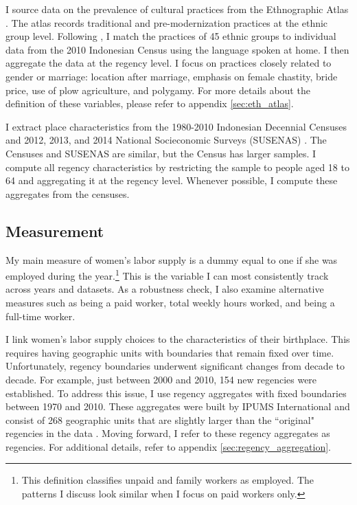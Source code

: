 I source data on the prevalence of cultural practices from the Ethnographic Atlas \citep{Murdock1967}. The atlas records traditional and pre-modernization practices at the ethnic group level. Following \cite{Bau}, I match the practices of 45 ethnic groups to individual data from the 2010 Indonesian Census using the language spoken at home. I then aggregate the data at the regency level. I focus on practices closely related to gender or marriage: location after marriage, emphasis on female chastity, bride price, use of plow agriculture, and polygamy. For more details about the definition of these variables, please refer to appendix \ref{sec:eth_atlas}.


I extract place characteristics from the 1980-2010 Indonesian Decennial Censuses   and 2012, 2013, and 2014 National Socieconomic Surveys (SUSENAS) \citep{BadanPusatStatistik2019a, BadanPusatStatistik2020}. The Censuses and SUSENAS are similar, but the Census has larger samples. I compute all regency characteristics by restricting the sample to people aged 18 to 64 and aggregating it at the regency level. Whenever possible, I compute these aggregates from the censuses.



\subsection{Measurement}
\label{sec:measurement}
My main measure of women's labor supply is a dummy equal to one if she was employed during the year.\footnote{This definition classifies unpaid and family workers as employed. The patterns I discuss look similar when I focus on paid workers only.} This is the variable I can most consistently track across years and datasets. As a robustness check, I also examine alternative measures such as being a paid worker, total weekly hours worked, and being a full-time worker.


I link women's labor supply choices to the characteristics of their birthplace. This requires having geographic units with boundaries that remain fixed over time. Unfortunately, regency boundaries underwent significant changes from decade to decade. For example, just between 2000 and 2010, 154 new regencies were established. To address this issue, I use regency aggregates with fixed boundaries between 1970 and 2010. These aggregates were built by IPUMS International and consist of 268 geographic units that are slightly larger than the ``original" regencies in the data \citep{MinnesotaPopulationCenter2020}. Moving forward, I refer to these regency aggregates as regencies. For additional details, refer to appendix \ref{sec:regency_aggregation}.

